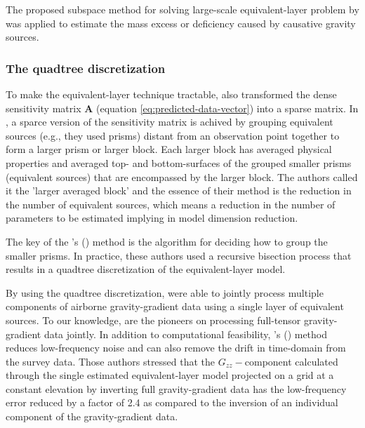 The proposed subspace method for solving large-scale equivalent-layer problem by \cite{mendoncca2020} was applied to  estimate the mass excess or deficiency caused by causative gravity sources.


\subsubsection{The quadtree discretization}

To make the equivalent-layer technique tractable, \cite{barnes-lumley2011} also transformed the dense sensitivity matrix $\mathbf{A}$ (equation \ref{eq:predicted-data-vector}) into a sparse matrix.
In \cite{barnes-lumley2011}, a sparce version of the sensitivity matrix is achived by grouping equivalent sources (e.g., they used prisms) distant from an observation point together to form a larger prism 
or larger block.
Each larger block has averaged physical properties and averaged top- and bottom-surfaces of the grouped smaller prisms (equivalent sources) that are encompassed by the larger block.
The authors called it the 'larger averaged block' and the essence of their method is the reduction 
in the number of equivalent sources, which means a reduction in the number of parameters to be estimated 
implying in model dimension reduction.

The key of the \citeauthor{barnes-lumley2011}'s (\citeyear{barnes-lumley2011}) method is the 
algorithm for deciding how to group the smaller prisms.
In practice, these authors used a recursive bisection process that results in a quadtree discretization  
of the equivalent-layer model. 

By using the quadtree discretization, \cite{barnes-lumley2011} were able to jointly process multiple components of airborne gravity-gradient data using a single layer of equivalent sources. 
To our knowledge, \cite{barnes-lumley2011} are the pioneers on processing 
full-tensor gravity-gradient data jointly.
In addition to computational feasibility,  \citeauthor{barnes-lumley2011}'s (\citeyear{barnes-lumley2011}) method reduces low-frequency noise and can also remove the drift in time-domain from the survey data. 
Those authors stressed that the $G_{zz}-$component calculated through the single estimated equivalent-layer model projected on a grid at a constant elevation by inverting full gravity-gradient data
has the low-frequency error reduced by a factor of 2.4 as compared to the inversion 
of an individual component of the gravity-gradient data.



